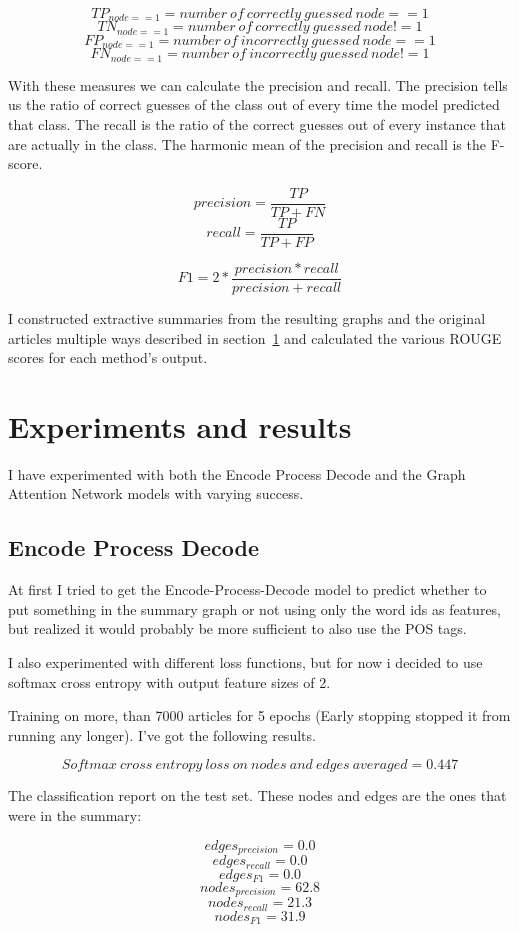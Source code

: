 \[TP_{node==1} = number\ of\ correctly\ guessed\ node==1\]
\[TN_{node==1} = number\ of\ correctly\ guessed\ node!=1\]
\[FP_{node==1} = number\ of\ incorrectly\ guessed\ node==1\]
\[FN_{node==1} = number\ of\ incorrectly\ guessed\ node!=1\]

With these measures we can calculate the precision and recall. The precision tells us the ratio of correct guesses of the class out of every time the model predicted that class. The recall is the ratio of the correct guesses out of every instance that are actually in the class. The harmonic mean of the precision and recall is the F-score.

\[precision = \frac{TP}{TP + FN}\]
\[recall = \frac{TP}{TP + FP}\]

\[F1 = 2 * \frac{precision * recall}{precision + recall}\]

I constructed extractive summaries from the resulting graphs and the original articles multiple ways described in section~\ref{ssect:ExperimnetsAndResults} and calculated the various ROUGE scores for each method's output.

\section{Experiments and results}\label{ssect:ExperimnetsAndResults}
I have experimented with both the Encode Process Decode and the Graph Attention Network models with varying success.
\subsection{Encode Process Decode}
At first I tried to get the Encode-Process-Decode model to predict whether to put something in the summary graph or not using only the word ids as features, but realized it would probably be more sufficient to also use the POS tags.

I also experimented with different loss functions, but for now i decided to use softmax cross entropy with output feature sizes of 2.

Training on more, than 7000 articles for 5 epochs (Early stopping stopped it from running any longer). I've got the following results.

\[Softmax\ cross\ entropy\ loss\ on\ nodes\ and\ edges\ averaged = 0.447\]

The classification report on the test set. These nodes and edges are the ones that were in the summary:

\[edges_{precision} = 0.0\]
\[edges_{recall} = 0.0\]
\[edges_{F1} = 0.0\]
\[nodes_{precision} = 62.8\]
\[nodes_{recall} = 21.3\]
\[nodes_{F1} = 31.9\]

